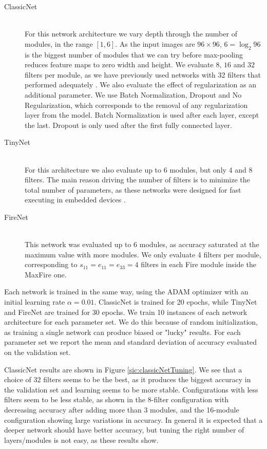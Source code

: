 \begin{description}
	\item[ClassicNet] \hfill \\
		For this network architecture we vary depth through the number of modules, in the range $[1, 6]$. As the input images are $96 \times 96$, $6 = \log_2{96}$ is the biggest number of modules that we can try before max-pooling reduces feature maps to zero width and height. We evaluate $8$, $16$ and $32$ filters per module, as we have previously used networks with 32 filters that performed adequately \cite{valdenegro2016object}.
		We also evaluate the effect of regularization as an additional parameter. We use Batch Normalization, Dropout and No Regularization, which corresponds to the removal of any regularization layer from the model. Batch Normalization is used after each layer, except the last. Dropout is only used after the first fully connected layer.
	\item[TinyNet] \hfill \\
		For this architecture we also evaluate up to 6 modules, but only 4 and 8 filters. The main reason driving the number of filters is to minimize the total number of parameters, as these networks were designed for fast executing in embedded devices \cite[-1.5em]{valdenegro2017rtcnns}.
	\item[FireNet] \hfill \\
		This network was evaluated up to 6 modules, as accuracy saturated at the maximum value with more modules. We only evaluate 4 filters per module, corresponding to $s_{11} = e_{11} = e_{33} = 4$ filters in each Fire module inside the MaxFire one.
\end{description}

Each network is trained in the same way, using the ADAM optimizer \cite{kingma2014adam} with an initial learning rate $\alpha = 0.01$. ClassicNet is trained for 20 epochs, while TinyNet and FireNet are trained for 30 epochs. We train 10 instances of each network architecture for each parameter set. We do this because of random initialization, as training a single network can produce biased or "lucky" results. For each parameter set we report the mean and standard deviation of accuracy evaluated on the validation set.

ClassicNet results are shown in Figure \ref{sic:classicNetTuning}. We see that a choice of 32 filters seems to be the best, as it produces the biggest accuracy in the validation set and learning seems to be more stable. Configurations with less filters seem to be less stable, as shown in the 8-filter configuration with decreasing accuracy after adding more than 3 modules, and the 16-module configuration showing large variations in accuracy.
In general it is expected that a deeper network should have better accuracy, but tuning the right number of layers/modules is not easy, as these results show.

